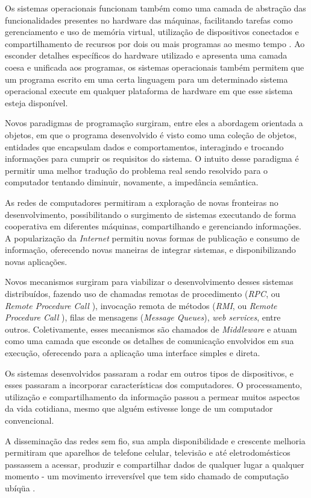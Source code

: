 \documentclass[11pt,twoside,a4paper]{book}
\begin{document}
Os sistemas operacionais funcionam também como uma camada de abstração das funcionalidades presentes no hardware das máquinas, facilitando tarefas como gerenciamento e uso de memória virtual, utilização de dispositivos conectados e compartilhamento de recursos por dois ou mais programas ao mesmo tempo \cite{so}. Ao esconder detalhes específicos do hardware utilizado e apresenta uma camada coesa e unificada aos programas, os sistemas operacionais também permitem que um programa escrito em uma certa linguagem para um determinado sistema operacional execute em qualquer plataforma de hardware em que esse sistema esteja disponível. 

Novos paradigmas de programação surgiram, entre eles a abordagem orientada a objetos, em que o programa desenvolvido é visto como uma coleção de objetos, entidades que encapsulam dados e comportamentos, interagindo e trocando informações para cumprir os requisitos do sistema. O intuito desse paradigma é permitir uma melhor tradução do problema real sendo resolvido para o computador tentando diminuir, novamente, a impedância semântica.

As redes de computadores permitiram a exploração de novas fronteiras no desenvolvimento, possibilitando o surgimento de sistemas executando de forma cooperativa em diferentes máquinas, compartilhando e gerenciando informações. A popularização da \emph{Internet} permitiu novas formas de publicação e consumo de informação, oferecendo novas maneiras de integrar sistemas, e disponibilizando novas aplicações. 

Novos mecanismos surgiram para viabilizar o desenvolvimento desses sistemas distribuídos, fazendo uso de chamadas remotas de procedimento (\emph{RPC}, ou \emph{Remote Procedure Call} \cite{rpc}), invocação remota de métodos (\emph{RMI}, ou \emph{Remote Procedure Call} \cite{rmi}), filas de mensagens (\emph{Message Queues}), \emph{web services}, entre outros. Coletivamente, esses mecanismos são chamados de \emph{Middleware} \cite{alonso} e atuam como uma camada que esconde os detalhes de comunicação envolvidos em sua execução, oferecendo para a aplicação uma interface simples e direta.

Os sistemas desenvolvidos passaram a rodar em outros tipos de dispositivos, e esses passaram a incorporar características dos computadores. O processamento, utilização e compartilhamento da informação passou a permear muitos aspectos da vida cotidiana, mesmo que alguém estivesse longe de um computador convencional. 

A disseminação das redes sem fio, sua ampla disponibilidade e crescente melhoria permitiram que aparelhos de telefone celular, televisão e até eletrodomésticos passassem a acessar, produzir e compartilhar dados de qualquer lugar a qualquer momento - um movimento irreversível que tem sido chamado de computação ubíqüa \cite{ubiquitous}. 
\end{document}
